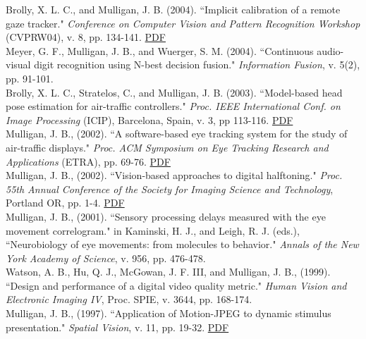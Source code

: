\documentclass[12pt]{article}
\newcommand{\years}[1]{\marginnote{\scriptsize #1}}
\begin{document}
Brolly, X. L. C., and Mulligan, J. B. (2004).
``Implicit calibration of a remote gaze tracker."
\emph{Conference on Computer Vision and Pattern Recognition Workshop} (CVPRW04),
v. 8, pp. 134-141.  \href{https://hsi.arc.nasa.gov/publications/Brolly_Mulligan_galvo.pdf}{PDF}\\

Meyer, G. F., Mulligan, J. B., and Wuerger, S. M. (2004).
``Continuous audio-visual digit recognition using N-best decision fusion."
\emph{Information Fusion}, v. 5(2), pp. 91-101.\\

\years{2003}
Brolly, X. L. C., Stratelos, C., and Mulligan, J. B. (2003).
``Model-based head pose estimation for air-traffic controllers."
\emph{Proc. IEEE International Conf. on Image Processing} (ICIP),
Barcelona, Spain, v. 3, pp 113-116.  \href{https://hsi.arc.nasa.gov/publications/mulligan_icip03.pdf}{PDF}\\

\years{2002}
Mulligan, J. B., (2002).
``A software-based eye tracking system for the study of air-traffic displays."
\emph{Proc. ACM Symposium on Eye Tracking Research and Applications} (ETRA),
pp. 69-76.  \href{https://hsi.arc.nasa.gov/publications/mulligan_etra02jbm.pdf}{PDF}\\

Mulligan, J. B., (2002).
``Vision-based approaches to digital halftoning."
\emph{Proc. 55th Annual Conference
of the Society for Imaging Science and Technology},
Portland OR, pp. 1-4.  \href{https://hsi.arc.nasa.gov/publications/mulligan_pics02_jbm.pdf}{PDF}\\

\years{2001}
Mulligan, J. B., (2001).
``Sensory processing delays measured with the eye movement correlogram."
in Kaminski, H. J., and Leigh, R. J. (eds.),
``Neurobiology of eye movements:  from molecules to behavior."
\emph{Annals of the New York Academy of Science}, v. 956, pp. 476-478.\\

\years{1999}
Watson, A. B., Hu, Q. J., McGowan, J. F. III, and Mulligan, J. B., (1999).
``Design and performance of a digital video quality metric."
\emph{Human Vision and Electronic Imaging IV}, 
Proc. SPIE, v. 3644,
pp. 168-174.\\

\years{1997}
Mulligan, J. B., (1997).
``Application of Motion-JPEG to dynamic stimulus presentation."
\emph{Spatial Vision}, v. 11, pp. 19-32.  \href{https://hsi.arc.nasa.gov/publications/Mulligan_m_jpeg.pdf}{PDF}\\
\end{document}
